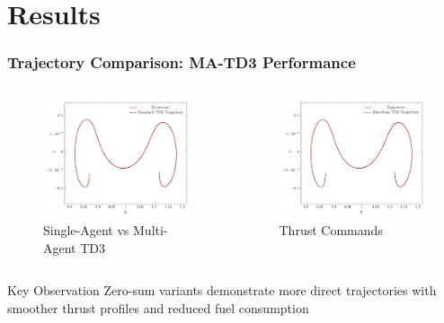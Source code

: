 \documentclass[
    11pt, %
    aspectratio=169, %
]{beamer}
\begin{document}
\section{Results}

\begin{frame}
	\frametitle{Trajectory Comparison: MA-TD3 Performance}
	\vspace{-.75cm}
	\begin{columns}[t]
		\begin{column}{0.5\textwidth}
			\begin{figure}
				\centering
				\includegraphics[width=.7\textwidth]{../../Report/plots/td3/trajectory_force/plot_trajectory}
				\vspace{-.5cm}
				\caption{Single-Agent vs Multi-Agent TD3}
			\end{figure}
		\end{column}
		\begin{column}{0.5\textwidth}
			\begin{figure}
				\centering
				\includegraphics[width=.7\textwidth]{../../Report/plots/td3/trajectory_force/plot_trajectory_zs}
				\vspace{-.5cm}
				\caption{Thrust Commands}
			\end{figure}
		\end{column}
	\end{columns}
	\vspace{-0.5cm}
	\begin{alertblock}{Key Observation}
		Zero-sum variants demonstrate more direct trajectories with smoother thrust profiles and reduced fuel consumption
	\end{alertblock}
\end{frame}
\end{document}
